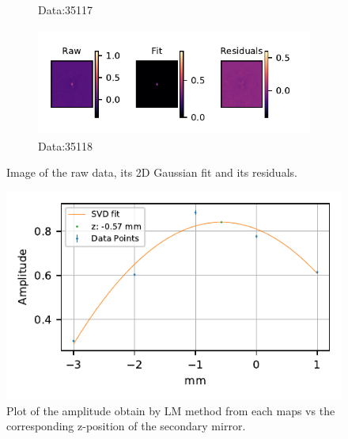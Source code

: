 \begin{figure}
\begin{subfigure}[b]{.45\textwidth}
        \caption{Data:35117}
        \label{fig:lmtFit7}
    \end{subfigure}
    \begin{subfigure}[b]{.45\textwidth}
        \centering
        \includegraphics[height=100pt]{CodeAndFigures/DataFits8.pdf}
        \caption{Data:35118}
        \label{fig:lmtFit8}
    \end{subfigure}
    \caption{Image of the raw data, its 2D Gaussian fit and its residuals.}
    \label{fig:lmtRaw}
\end{figure}


\begin{figure}
    \centering
    \includegraphics{CodeAndFigures/QuadFitPlot.pdf}
    \caption{Plot of the amplitude obtain by LM method from each maps vs the corresponding z-position of the secondary mirror. }
    \label{fig:lmtquadfit}
\end{figure}

\subsection{}

